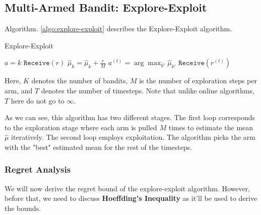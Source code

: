 \documentclass[11pt]{article}
\begin{document}
\subsection{Multi-Armed Bandit: Explore-Exploit}
Algorithm. \ref{algo:explore-exploit} describes the Explore-Exploit algorithm.
\begin{algorithm}
\caption{Explore-Exploit}
\label{algo:explore-exploit}
\begin{algorithmic}[1]
\STATE $a = k$
\STATE $\mathtt{Receive}(r)$
\STATE $\hat{\mu}_k = \hat{\mu}_k + \frac{r}{M}$
\ENDFOR
\ENDFOR
{}
\STATE $a^{(t)} = \arg \max_{k'} \hat{\mu}_{k'}$
\STATE $\mathtt{Receive}(r^{(t)})$
\ENDFOR
\end{algorithmic}
\end{algorithm}

Here, $K$ denotes the number of bandits, $M$ is the number of exploration steps per arm, and $T$ denotes the number of timesteps. Note that unlike online algorithms, $T$ here do not go to $\infty$. 

As we can see, this algorithm has two different stages. The first loop corresponds to the exploration stage where each arm is pulled $M$ times to estimate the mean $\hat{\mu} $ iteratively. The second loop employs exploitation. The algorithm picks the arm with the "best" estimated mean for the rest of the timesteps.


\subsubsection{Regret Analysis}

We will now derive the regret bound of the explore-exploit algorithm. However, before that, we need to discuss \normalfont \textbf{Hoeffding's Inequality} as it'll be used to derive the bounds.





\end{document}
